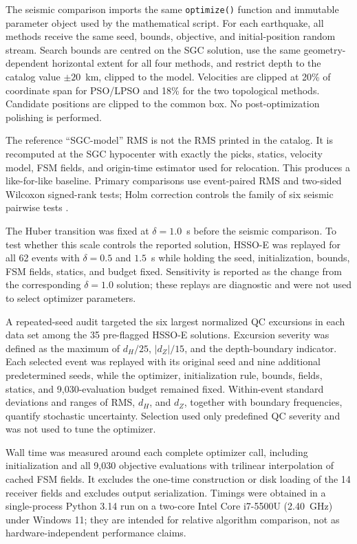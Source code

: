 \documentclass[10pt]{article}
\begin{document}
The seismic comparison imports the same \texttt{optimize()} function and immutable parameter object used by the mathematical script. For each earthquake, all methods receive the same seed, bounds, objective, and initial-position random stream. Search bounds are centred on the SGC solution, use the same geometry-dependent horizontal extent for all four methods, and restrict depth to the catalog value $\pm20$~km, clipped to the model. Velocities are clipped at 20\% of coordinate span for PSO/LPSO and 18\% for the two topological methods. Candidate positions are clipped to the common box. No post-optimization polishing is performed.

The reference ``SGC-model'' RMS is not the RMS printed in the catalog. It is recomputed at the SGC hypocenter with exactly the picks, statics, velocity model, FSM fields, and origin-time estimator used for relocation. This produces a like-for-like baseline. Primary comparisons use event-paired RMS and two-sided Wilcoxon signed-rank tests; Holm correction controls the family of six seismic pairwise tests \citep{Derrac2011}.

The Huber transition was fixed at $\delta=1.0$~s before the seismic comparison. To test whether this scale controls the reported solution, HSSO-E was replayed for all 62 events with $\delta=0.5$ and $1.5$~s while holding the seed, initialization, bounds, FSM fields, statics, and budget fixed. Sensitivity is reported as the change from the corresponding $\delta=1.0$ solution; these replays are diagnostic and were not used to select optimizer parameters.

A repeated-seed audit targeted the six largest normalized QC excursions in each data set among the 35 pre-flagged HSSO-E solutions. Excursion severity was defined as the maximum of $d_H/25$, $|d_Z|/15$, and the depth-boundary indicator. Each selected event was replayed with its original seed and nine additional predetermined seeds, while the optimizer, initialization rule, bounds, fields, statics, and 9,030-evaluation budget remained fixed. Within-event standard deviations and ranges of RMS, $d_H$, and $d_Z$, together with boundary frequencies, quantify stochastic uncertainty. Selection used only predefined QC severity and was not used to tune the optimizer.

Wall time was measured around each complete optimizer call, including initialization and all 9,030 objective evaluations with trilinear interpolation of cached FSM fields. It excludes the one-time construction or disk loading of the 14 receiver fields and excludes output serialization. Timings were obtained in a single-process Python 3.14 run on a two-core Intel Core i7-5500U (2.40~GHz) under Windows 11; they are intended for relative algorithm comparison, not as hardware-independent performance claims.
\end{document}
